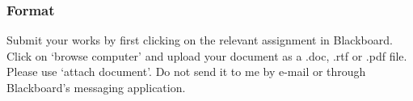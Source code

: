 \documentclass[10]{article}
\begin{document}
\subsubsection{Format}\label{format}

Submit your works by first clicking on the relevant assignment in
Blackboard. Click on `browse computer' and upload your document as a
.doc, .rtf or .pdf file. Please use `attach document'. Do not send it to
me by e-mail or through Blackboard's messaging application.
\end{document}
